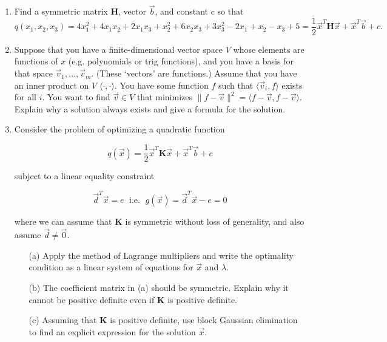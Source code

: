 \documentclass[11pt,fleqn]{article}
\begin{document}
\begin{enumerate}
\item Find a symmetric matrix $\mathbf{H}$, vector $\vec{b}$, and constant c so that
\[q(x_1,x_2,x_3) = 4x_1^2+4x_1x_2 + 2x_1x_3 + x_2^2+6x_2x_3 + 3x_3^2 -2x_1+x_2-x_3+5 = \frac{1}{2}\vec{x}^T\mathbf{H}\vec{x} + \vec{x}^T\vec{b} + c.\]
\item Suppose that you have a finite-dimensional vector space $V$ whose elements are functions of $x$ (e.g. polynomials or trig functions), and you have a basis for that space $\vec{v}_1,\ldots,\vec{v}_m$. (These `vectors' are functions.) Assume that you have an inner product on $V$ $\langle\cdot,\cdot\rangle$. You have some function $f$ such that $\langle\vec{v}_i,f\rangle$ exists for all $i$. You want to find $\vec{v}\in V$ that minimizes $\|f-\vec{v}\|^2 = \langle f-\vec{v},f-\vec{v}\rangle$. Explain why a solution always exists and give a formula for the solution.
\item Consider the problem of optimizing a quadratic function 

$$q(\vec{x}) = \frac{1}{2}\vec{x}^T\mathbf{K}\vec{x} + \vec{x}^T\vec{b} + c $$

subject to a linear equality constraint

$$\vec{d}^T\vec{x} = e\;\text{ i.e. }\;g(\vec{x}) = \vec{d}^T\vec{x} - e = 0$$

where we can assume that $\mathbf{K}$ is symmetric without loss of generality, and also assume $\vec{d}\neq\vec{0}$.

	\begin{itemize}
	\item[(a)] Apply the method of Lagrange multipliers and write the optimality condition as a linear system of equations for $\vec{x}$ and $\lambda$.
	\item[(b)] The coefficient matrix in (a) should be symmetric. Explain why it cannot be positive definite even if $\mathbf{K}$ is positive definite.
	\item[(c)] Assuming that $\mathbf{K}$ is positive definite, use block Gaussian elimination to find an explicit expression for the solution $\vec{x}$.
	\end{itemize}
\end{enumerate}
 
\end{document}
